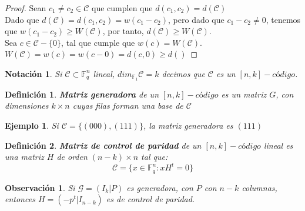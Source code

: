 \documentclass[spanish]{book}
\newtheorem{mydef}{Definición}
\newtheorem{nota}{Notación}
\newtheorem{ejem}{Ejemplo}
\newtheorem{obsv}{Observación}
\begin{document}
\begin{proof}
	Sean $c_1\neq c_2 \in \mathcal{C}$ que cumplen que $d(c_1, c_2)=d(\mathcal{C})$ \\
	Dado que $d(\mathcal{C})=d(c_1, c_2)=w(c_1-c_2)$, pero dado que $c_1-c_2 \neq 0$, tenemos que $w(c_1-c_2)\geq W(\mathcal{C})$, por tanto, $d(\mathcal{C}) \geq W(\mathcal{C})$. \\
	Sea $c \in \mathcal{C}-\{0\}$, tal que cumple que $w(c)=W(\mathcal{C})$. \\
	$W(\mathcal{C})=w(c)=w(c-0)=d(c, 0)\geq d()$
\end{proof}

\begin{nota}
	Si $\mathcal{C} \subset \mathbb{F}_q^n$ lineal, $dim _{\mathbb{F}_1} \mathcal{C}=k$ decimos que $\mathcal{C}$ es un $[n, k]-código$.
\end{nota}

\begin{mydef}
	\textbf{Matriz generadora} de un $[n, k]-código$ es un matriz $G$, con dimensiones $k\times n$ cuyas filas forman una base de $\mathcal{C}$
\end{mydef}

\begin{ejem}
	Si $\mathcal{C}=\{(000), (111)\}$, la matriz generadora es $(111)$
\end{ejem}

\begin{mydef}
	\textbf{Matriz de control de paridad} de un $[n, k]-código$ lineal es una matriz $H$ de orden $(n-k)\times n$ tal que: $$ \mathcal{C}=\{x \in \mathbb{F}_q^n: x H^t=0\}$$
\end{mydef}

\begin{obsv}
	Si $\mathcal{G}=(I_k | P)$ es generadora, con $P$ con $n-k$ columnas, entonces $H=(-p^t | I_{n-k})$ es de control de paridad.
\end{obsv}
\end{document}
